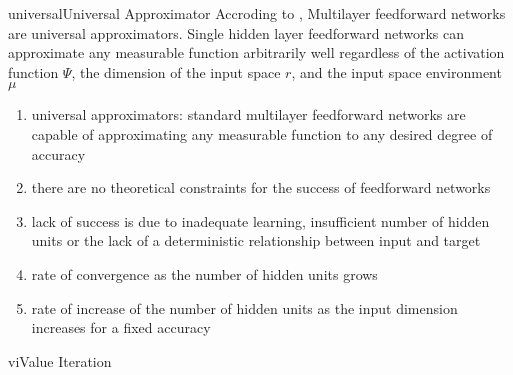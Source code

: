 \documentclass[9pt]{article}
\begin{document}
\begin{topic}{universal}{Universal Approximator} 
Accroding to \citep{hornik1989multilayer}, Multilayer feedforward networks are universal approximators. Single hidden layer  feedforward networks can approximate any measurable function arbitrarily well regardless of the activation function $\Psi$, the dimension of the input space $r$, and the input space environment $\mu$
\begin{enumerate}
\item universal approximators: standard multilayer feedforward networks are capable of approximating
any measurable function to any desired degree of accuracy
\item there are no theoretical constraints for the success of
feedforward networks
\item lack of success is due to inadequate learning, insufficient number of hidden units or the lack of a deterministic relationship between input and target
\item rate of convergence as the number of hidden units grows
\item rate of increase of the number of hidden units as the input dimension increases for a fixed accuracy
\end{enumerate}
\end{topic}

\begin{topic}{vi}{Value Iteration} 
\Working
\end{topic}
\end{document}
